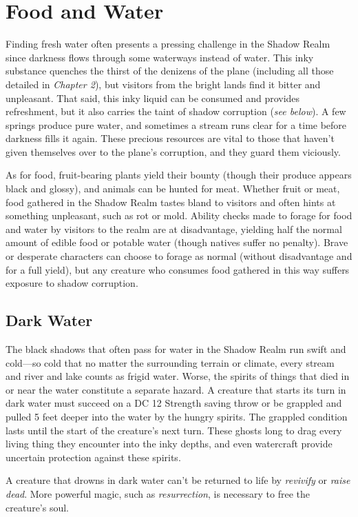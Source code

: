 \documentclass[10pt,a4paper,twoside,bg=print,twocolumn,openany,nodeprecatedcode]{dndbook}
\begin{document}
\section{Food and Water}
Finding fresh water often presents a pressing challenge in the Shadow Realm since darkness flows through some waterways instead of water. This inky substance quenches the thirst of the denizens of the plane (including all those detailed in \textit{Chapter 2}), but visitors from the bright lands find it bitter and unpleasant. That said, this inky liquid can be consumed and provides refreshment, but it also carries the taint of shadow corruption (\textit{see below}). A few springs produce pure water, and sometimes a stream runs clear for a time before darkness fills it again. These precious resources are vital to those that haven't given themselves over to the plane's corruption, and they guard them viciously.

As for food, fruit-bearing plants yield their bounty (though their produce appears black and glossy), and animals can be hunted for meat. Whether fruit or meat, food gathered in the Shadow Realm tastes bland to visitors and often hints at something unpleasant, such as rot or mold. Ability checks made to forage for food and water by visitors to the realm are at disadvantage, yielding half the normal amount of edible food or potable water (though natives suffer no penalty). Brave or desperate characters can choose to forage as normal (without disadvantage and for a full yield), but any creature who consumes food gathered in this way suffers exposure to shadow corruption.

\subsection{Dark Water}
The black shadows that often pass for water in the Shadow Realm run swift and cold—so cold that no matter the surrounding terrain or climate, every stream and river and lake counts as frigid water. Worse, the spirits of things that died in or near the water constitute a separate hazard. A creature that starts its turn in dark water must succeed on a DC 12 Strength saving throw or be grappled and pulled 5 feet deeper into the water by the hungry spirits. The grappled condition lasts until the start of the creature's next turn. These ghosts long to drag every living thing they encounter into the inky depths, and even watercraft provide uncertain protection against these spirits.

A creature that drowns in dark water can't be returned to life by \textit{revivify} or \textit{raise dead}. More powerful magic, such as \textit{resurrection}, is necessary to free the creature's soul.
\end{document}
